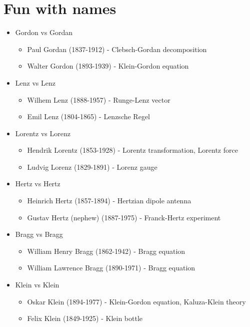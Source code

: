 \documentclass[10pt,a4paper]{book}
\theoremstyle{definition}
\begin{document}
\newpage
\chapter{Fun with names}
\begin{itemize}
\item Gordon vs Gordan
    \begin{itemize}
    \item {\sc Paul Gordan} (1837-1912) - Clebsch-Gordan decomposition
    \item {\sc Walter Gordon} (1893-1939) - Klein-Gordon equation
    \end{itemize}
\item Lenz vs Lenz
    \begin{itemize}
    \item {\sc Wilhem Lenz} (1888-1957) - Runge-Lenz vector
    \item {\sc Emil Lenz} (1804-1865) - Lenzsche Regel 
    \end{itemize}
\item Lorentz vs Lorenz
    \begin{itemize}
    \item {\sc Hendrik Lorentz} (1853-1928) - Lorentz transformation, Lorentz force
    \item {\sc Ludvig Lorenz} (1829-1891) - Lorenz gauge
    \end{itemize}
\item Hertz vs Hertz
    \begin{itemize}
    \item {\sc Heinrich Hertz} (1857-1894) - Hertzian dipole antenna
    \item {\sc Gustav Hertz (nephew)} (1887-1975) - Franck-Hertz experiment
    \end{itemize}
\item Bragg vs Bragg
    \begin{itemize}
    \item {\sc William Henry Bragg} (1862-1942) - Bragg equation
    \item {\sc William Lawrence Bragg} (1890-1971) - Bragg equation
    \end{itemize}
\item Klein vs Klein
    \begin{itemize}
    \item {\sc Oskar Klein} (1894-1977) - Klein-Gordon equation, Kaluza-Klein theory
    \item {\sc Felix Klein} (1849-1925) - Klein bottle
    \end{itemize}

\end{itemize}
\end{document}
